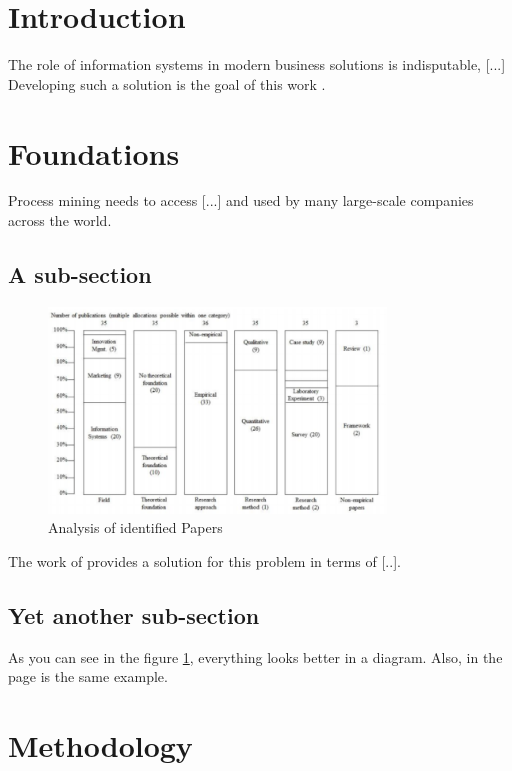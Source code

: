 \newpage\section{Introduction}

The role of information systems in modern business solutions is indisputable, [...] Developing such a solution is the goal of this work \parencite{venkatesh_usability_2014}. 

\newpage\section{Foundations}

Process mining needs to access [...] and used by many large-scale companies \parencite{hoehle_espoused_2015} across the world.


\subsection{A sub-section}
\begin{figure}[h]
    \centering
    \includegraphics[width=0.8\textwidth]{content/00_template/images/Picture1.png}
    \caption{Analysis of identified Papers}
    \label{fig:mesh1}
\end{figure}

The work of \textcite{hoehle_espoused_2015} provides a solution for this problem in terms of [..].

\subsection{Yet another sub-section}

As you can see in the figure \ref{fig:mesh1}, everything looks better in a diagram. Also, in the page \pageref{fig:mesh1} 
is the same example.

\newpage\section{Methodology}

